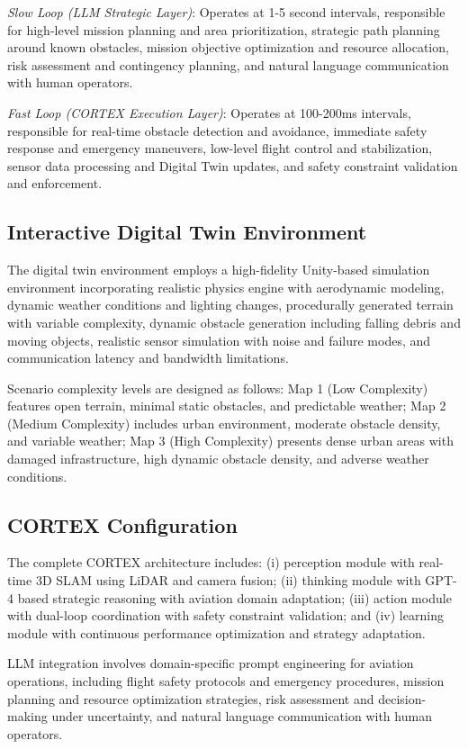 \emph{Slow Loop (LLM Strategic Layer)}: Operates at 1-5 second intervals, responsible for high-level mission planning and area prioritization, strategic path planning around known obstacles, mission objective optimization and resource allocation, risk assessment and contingency planning, and natural language communication with human operators.

\emph{Fast Loop (CORTEX Execution Layer)}: Operates at 100-200ms intervals, responsible for real-time obstacle detection and avoidance, immediate safety response and emergency maneuvers, low-level flight control and stabilization, sensor data processing and Digital Twin updates, and safety constraint validation and enforcement.

\subsection{Interactive Digital Twin Environment}

The digital twin environment employs a high-fidelity Unity-based simulation environment incorporating realistic physics engine with aerodynamic modeling, dynamic weather conditions and lighting changes, procedurally generated terrain with variable complexity, dynamic obstacle generation including falling debris and moving objects, realistic sensor simulation with noise and failure modes, and communication latency and bandwidth limitations.

Scenario complexity levels are designed as follows: Map 1 (Low Complexity) features open terrain, minimal static obstacles, and predictable weather; Map 2 (Medium Complexity) includes urban environment, moderate obstacle density, and variable weather; Map 3 (High Complexity) presents dense urban areas with damaged infrastructure, high dynamic obstacle density, and adverse weather conditions.

\subsection{CORTEX Configuration}

The complete CORTEX architecture includes: (i) perception module with real-time 3D SLAM using LiDAR and camera fusion; (ii) thinking module with GPT-4 based strategic reasoning with aviation domain adaptation; (iii) action module with dual-loop coordination with safety constraint validation; and (iv) learning module with continuous performance optimization and strategy adaptation.

LLM integration involves domain-specific prompt engineering for aviation operations, including flight safety protocols and emergency procedures, mission planning and resource optimization strategies, risk assessment and decision-making under uncertainty, and natural language communication with human operators.

